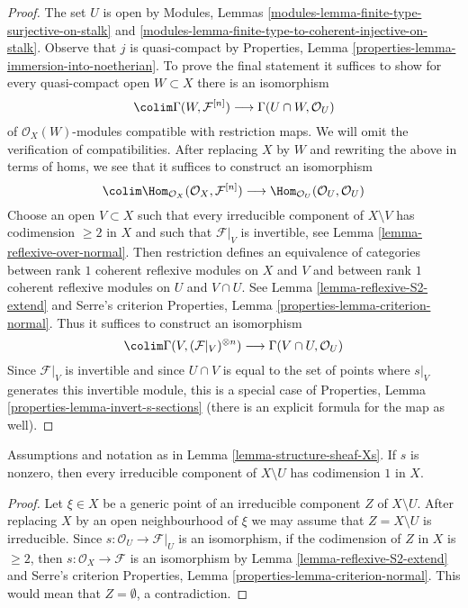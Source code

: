 \begin{proof}
The set $U$ is open by Modules, Lemmas
\ref{modules-lemma-finite-type-surjective-on-stalk} and
\ref{modules-lemma-finite-type-to-coherent-injective-on-stalk}.
Observe that $j$ is quasi-compact by
Properties, Lemma \ref{properties-lemma-immersion-into-noetherian}.
To prove the final statement it suffices to show for every
quasi-compact open $W \subset X$ there is an isomorphism
$$
\colim \Gamma(W, \mathcal{F}^{[n]})
\longrightarrow
\Gamma(U \cap W, \mathcal{O}_U)
$$
of $\mathcal{O}_X(W)$-modules compatible with restriction maps.
We will omit the verification of compatibilities.
After replacing $X$ by $W$ and rewriting the above in
terms of homs, we see that it suffices to construct an isomorphism
$$
\colim \Hom_{\mathcal{O}_X}(\mathcal{O}_X, \mathcal{F}^{[n]})
\longrightarrow
\Hom_{\mathcal{O}_U}(\mathcal{O}_U, \mathcal{O}_U)
$$
Choose an open $V \subset X$ such that every irreducible component of
$X \setminus V$ has codimension $\geq 2$ in $X$ and such that
$\mathcal{F}|_V$ is invertible, see Lemma \ref{lemma-reflexive-over-normal}.
Then restriction defines an equivalence of categories
between rank $1$ coherent reflexive modules on $X$ and $V$
and between rank $1$ coherent reflexive modules on $U$ and $V \cap U$.
See Lemma \ref{lemma-reflexive-S2-extend} and Serre's criterion
Properties, Lemma \ref{properties-lemma-criterion-normal}.
Thus it suffices to construct an isomorphism
$$
\colim \Gamma(V, (\mathcal{F}|_V)^{\otimes n}) \longrightarrow
\Gamma(V \cap U, \mathcal{O}_U)
$$
Since $\mathcal{F}|_V$ is invertible and since $U \cap V$ is
equal to the set of points where $s|_V$ generates this invertible module,
this is a special case of
Properties, Lemma \ref{properties-lemma-invert-s-sections}
(there is an explicit formula for the map as well).
\end{proof}

\begin{lemma}
\label{lemma-Xs-codim-complement}
Assumptions and notation as in Lemma \ref{lemma-structure-sheaf-Xs}.
If $s$ is nonzero, then every irreducible component of $X \setminus U$
has codimension $1$ in $X$.
\end{lemma}

\begin{proof}
Let $\xi \in X$ be a generic point of an irreducible component $Z$ of
$X \setminus U$. After replacing $X$ by an open neighbourhood of
$\xi$ we may assume that $Z = X \setminus U$ is irreducible. Since
$s : \mathcal{O}_U \to \mathcal{F}|_U$ is an isomorphism, if
the codimension of $Z$ in $X$ is $\geq 2$, then
$s : \mathcal{O}_X \to \mathcal{F}$ is an isomorphism by
Lemma \ref{lemma-reflexive-S2-extend} and Serre's criterion
Properties, Lemma \ref{properties-lemma-criterion-normal}.
This would mean that $Z = \emptyset$, a contradiction.
\end{proof}

